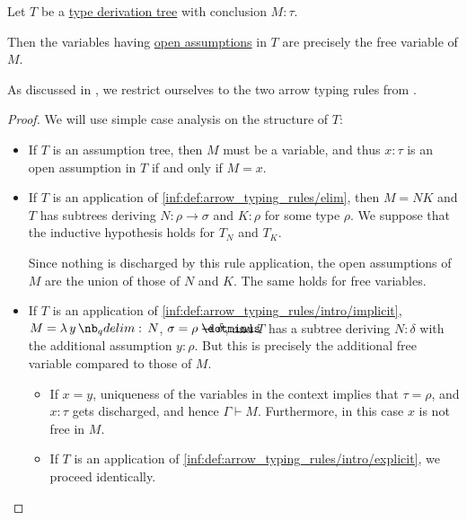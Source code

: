 \begin{proposition}\label{thm:assumptions_and_free_variables}
  Let \( T \) be a \hyperref[def:type_derivation_tree]{type derivation tree} with conclusion \( M: \tau \).

  Then the variables having \hyperref[def:type_derivation_tree/context]{open assumptions} in \( T \) are precisely the free variable of \( M \).
\end{proposition}
\begin{comments}
  \item As discussed in , we restrict ourselves to the two arrow typing rules from .
\end{comments}
\begin{proof}
  We will use simple case analysis on the structure of \( T \):
  \begin{itemize}
    \item If \( T \) is an assumption tree, then \( M \) must be a variable, and thus \( x: \tau \) is an open assumption in \( T \) if and only if \( M = x \).

    \item If \( T \) is an application of \ref{inf:def:arrow_typing_rules/elim}, then \( M = NK \) and \( T \) has subtrees deriving \( N: \rho \to \sigma \) and \( K: \rho \) for some type \( \rho \). We suppose that the inductive hypothesis holds for \( T_N \) and \( T_K \).

    Since nothing is discharged by this rule application, the open assumptions of \( M \) are the union of those of \( N \) and \( K \). The same holds for free variables.

    \item If \( T \) is an application of \ref{inf:def:arrow_typing_rules/intro/implicit}, \( M = \qabs y N \), \( \sigma = \rho \synimplies \delta \), and \( T \) has a subtree deriving \( N: \delta \) with the additional assumption \( y: \rho \). But this is precisely the additional free variable compared to those of \( M \).

    \begin{itemize}
      \item If \( x = y \), uniqueness of the variables in the context implies that \( \tau = \rho \), and \( x: \tau \) gets discharged, and hence \( \Gamma \vdash M \). Furthermore, in this case \( x \) is not free in \( M \).

      \item If \( T \) is an application of \ref{inf:def:arrow_typing_rules/intro/explicit}, we proceed identically.
    \end{itemize}
  \end{itemize}
\end{proof}

